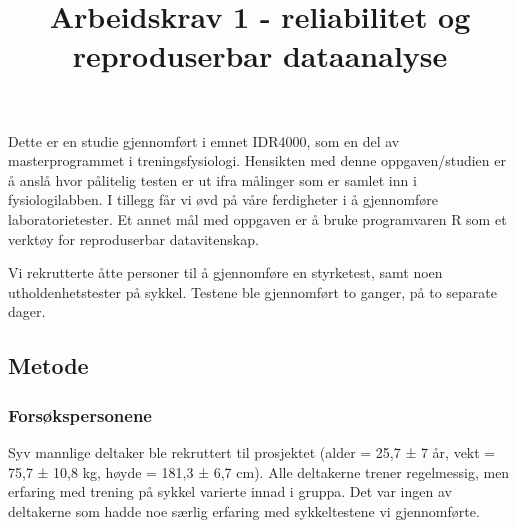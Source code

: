 \documentclass[
  letterpaper,
  DIV=11,
  numbers=noendperiod]{scrartcl}
\title{Arbeidskrav 1 - reliabilitet og reproduserbar dataanalyse}
\author{}
\date{}
\begin{document}
\maketitle
\ifdefined\Shaded\renewenvironment{Shaded}{\begin{tcolorbox}[frame hidden, borderline west={3pt}{0pt}{shadecolor}, enhanced, breakable, interior hidden, boxrule=0pt, sharp corners]}{\end{tcolorbox}}\fi

Dette er en studie gjennomført i emnet IDR4000, som en del av
masterprogrammet i treningsfysiologi. Hensikten med denne
oppgaven/studien er å anslå hvor pålitelig testen er ut ifra målinger
som er samlet inn i fysiologilabben. I tillegg får vi øvd på våre
ferdigheter i å gjennomføre laboratorietester. Et annet mål med oppgaven
er å bruke programvaren R som et verktøy for reproduserbar
datavitenskap.

Vi rekrutterte åtte personer til å gjennomføre en styrketest, samt noen
utholdenhetstester på sykkel. Testene ble gjennomført to ganger, på to
separate dager.

\hypertarget{metode}{%
\subsection{Metode}\label{metode}}

\hypertarget{forsuxf8kspersonene}{%
\subsubsection{Forsøkspersonene}\label{forsuxf8kspersonene}}

Syv mannlige deltaker ble rekruttert til prosjektet (alder = 25,7 ± 7
år, vekt = 75,7 ± 10,8 kg, høyde = 181,3 ± 6,7 cm). Alle deltakerne
trener regelmessig, men erfaring med trening på sykkel varierte innad i
gruppa. Det var ingen av deltakerne som hadde noe særlig erfaring med
sykkeltestene vi gjennomførte.
\end{document}

